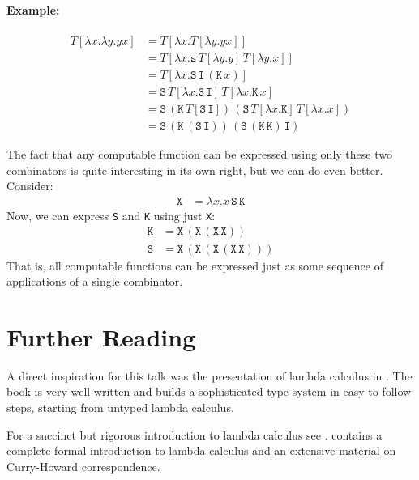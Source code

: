 \documentclass[11pt,twoside,a4paper]{article} %
\newcommand{\sym}[1]{\texttt{#1}}
\newcommand{\msym}[1]{\mathtt{#1}}
\begin{document}
\paragraph{Example:}
\begin{align*}
T[\lambda x.\lambda y.yx] &= T[\lambda x.T[\lambda y.yx]] \\
                          &= T[\lambda x.\msym{s}\,T[\lambda y.y]\,T[\lambda y.x]]
                          \\
                          &= T[\lambda x.\msym{S}\,\msym{I}\,(\msym{K}\,x)] \\
                          &= \msym{S}\,T[\lambda x.\msym{S}\,\msym{I}]\,T[
                          \lambda x.\msym{K}\,x] \\
                          &= \msym{S}\,(\msym{K}\,T[\msym{S}\,\msym{I}])\,(\msym
                          {S}\,T[\lambda x.\msym{K}]\,T[\lambda x.x]) \\
                          &= \msym{S}\,(\msym{K}\,(\msym{S}\,\msym{I}))\,(\msym{
                          S}\,(\msym{K}\,\msym{K})\,\msym{I})
\end{align*}

The fact that any computable function can be expressed using only these two
combinators is quite interesting in its own right, but we can do even better. 
Consider:
\begin{align*}
\msym{X} &= \lambda x.x\,\msym{S}\,\msym{K}
\end{align*}
Now, we can express \sym{S} and \sym{K} using just \sym{X}:
\begin{align*}
\msym{K} &= \msym{X}\,(\msym{X}\,(\msym{X}\,\msym{X})) \\
\msym{S} &= \msym{X}\,(\msym{X}\,(\msym{X}\,(\msym{X}\,\msym{X})))
\end{align*}
That is, all computable functions can be expressed just as some sequence of
applications of a single combinator.


\section{Further Reading}

A direct inspiration for this talk was the presentation of lambda calculus in
\cite{TAPL}. The book is very well written and builds a sophisticated type
system in easy to follow steps, starting from untyped lambda calculus. 

For a succinct but rigorous introduction to lambda calculus see \cite{bb00}.
\cite{su99} contains a complete formal introduction to lambda calculus and an
extensive material on Curry-Howard correspondence.
\end{document}

